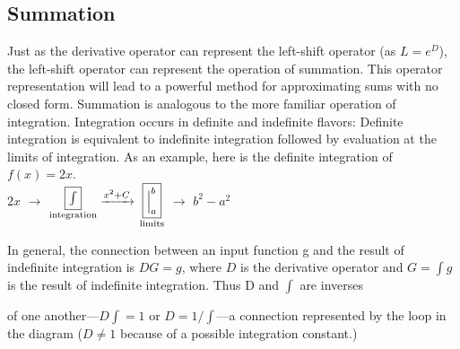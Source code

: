 \documentclass[fleqn]{book}
\begin{document}
\subsection {\Large Summation}



\noindent\Large 
{Just as the derivative operator can represent the left-shift operator (as $L =
e^D$), the left-shift operator can represent the operation of summation. This
operator representation will lead to a powerful method for approximating
sums with no closed form.
Summation is analogous to the more familiar operation of integration.
Integration occurs in definite and indefinite flavors: Definite integration
is equivalent to indefinite integration followed by evaluation at the limits
of integration. As an example, here is the definite integration of $f(x) = 2x$.}
\\


\hangindent=1.5cm {$2x$ $\longrightarrow$ $\underset{\textrm{integration}}{\fbox{\huge{$\int$}}}\xrightarrow{x^2+C}$ $\underset{\textrm{limits}}{\fbox{$\Big|_a^b$}}$} $\longrightarrow$ $b^2-a^2$ \vspace{0.5cm}


\noindent In general, the connection between an input function g and the result of
indefinite integration is $DG = g$, where $D$ is the derivative operator and
$G=\int g$ is the result of indefinite integration. Thus D and $\int$ are inverses\\



\newpage


\pagestyle{fancy}



\renewcommand{\headrulewidth}{0pt}
\fancyhf{}

\noindent \Large {of one another---$D\int=1$ or $D=1/\int$---a connection represented by the loop in the diagram ($D\not=1$ because of a possible integration constant.)}
\\
\\
\\
\end{document}
